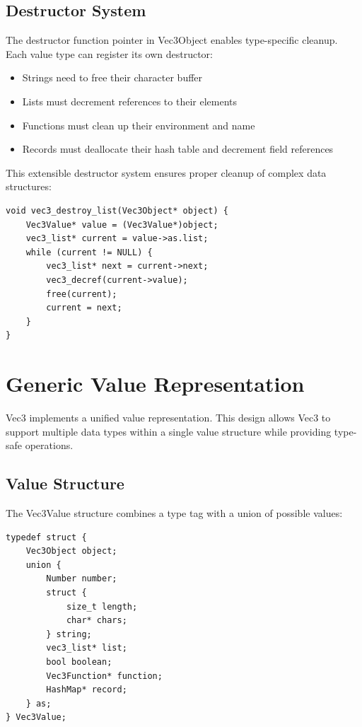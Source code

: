 \subsection{Destructor System}\label{subsec:destructor-system}
The destructor function pointer in Vec3Object enables type-specific cleanup.
Each value type can register its own destructor:

\begin{itemize}[nolistsep]
\item Strings need to free their character buffer
\item Lists must decrement references to their elements
\item Functions must clean up their environment and name
\item Records must deallocate their hash table and decrement field references
\end{itemize}

This extensible destructor system ensures proper cleanup of complex data structures:

\begin{verbatim}
void vec3_destroy_list(Vec3Object* object) {
    Vec3Value* value = (Vec3Value*)object;
    vec3_list* current = value->as.list;
    while (current != NULL) {
        vec3_list* next = current->next;
        vec3_decref(current->value);
        free(current);
        current = next;
    }
}
\end{verbatim}

\section{Generic Value Representation}\label{sec:generic-value}

Vec3 implements a unified value representation.
This design allows Vec3 to support multiple data types within a single value structure while providing type-safe operations.

\subsection{Value Structure}\label{subsec:value-structure}

The Vec3Value structure combines a type tag with a union of possible values:

\begin{verbatim}
typedef struct {
    Vec3Object object;
    union {
        Number number;
        struct {
            size_t length;
            char* chars;
        } string;
        vec3_list* list;
        bool boolean;
        Vec3Function* function;
        HashMap* record;
    } as;
} Vec3Value;
\end{verbatim}

